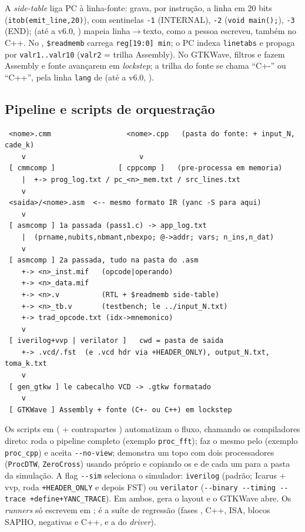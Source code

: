 A \emph{side-table} liga PC à linha-fonte:  grava, por
instrução, a linha em 20 bits (\lstinline|itob(emit_line,20)|), com sentinelas
\lstinline|-1| (INTERNAL), \lstinline|-2| (\lstinline|void main();|),
\lstinline|-3| (END);  (até a v6.0, )
mapeia linha$\to$texto, como a pessoa escreveu, também no C++. No
, \lstinline|$readmemb| carrega \lstinline|reg[19:0] min|; o PC
indexa \lstinline|linetabs| e propaga por \lstinline|valr1..valr10|
(\lstinline|valr2| = trilha Assembly). No GTKWave, filtros 
e  fazem Assembly e fonte avançarem em \emph{lockstep}; a
trilha do fonte se chama \enquote{C+-} ou \enquote{C++}, pela linha
\lstinline|lang| de  (até a v6.0, ).

\subsection{Pipeline e scripts de orquestração}
\label{sec:S04-pipeline}

\begin{lstlisting}
 <nome>.cmm                  <nome>.cpp   (pasta do fonte: + input_N, cade_k)
    v                           v
 [ cmmcomp ]               [ cppcomp ]   (pre-processa em memoria)
    |  +-> prog_log.txt / pc_<n>_mem.txt / src_lines.txt
    v
 <saida>/<nome>.asm  <-- mesmo formato IR (yanc -S para aqui)
    v
 [ asmcomp ] 1a passada (pass1.c) -> app_log.txt
    |  (prname,nubits,nbmant,nbexpo; @->addr; vars; n_ins,n_dat)
    v
 [ asmcomp ] 2a passada, tudo na pasta do .asm
    +-> <n>_inst.mif   (opcode|operando)
    +-> <n>_data.mif
    +-> <n>.v          (RTL + $readmemb side-table)
    +-> <n>_tb.v       (testbench; le ../input_N.txt)
    +-> trad_opcode.txt (idx->mnemonico)
    v
 [ iverilog+vvp | verilator ]   cwd = pasta de saida
    +-> .vcd/.fst  (e .vcd hdr via +HEADER_ONLY), output_N.txt, toma_k.txt
    v
 [ gen_gtkw ] le cabecalho VCD -> .gtkw formatado
    v
 [ GTKWave ] Assembly + fonte (C+- ou C++) em lockstep
\end{lstlisting}

Os scripts em  ( + contrapartes )
automatizam o fluxo, chamando os compiladores direto:  roda
o pipeline \cmm{} completo (exemplo \lstinline|proc_fft|);
 faz o mesmo pelo  (exemplo
\lstinline|proc_cpp|) e aceita \lstinline|--no-view|; 
demonstra um topo com dois processadores (\lstinline|ProcDTW|,
\lstinline|ZeroCross|) usando  próprio e copiando os
 e  de cada um para a pasta da simulação. A flag
\lstinline|--sim| seleciona o simulador: \lstinline|iverilog| (padrão; Icarus +
vvp, roda \lstinline|+HEADER_ONLY| e depois FST) ou \lstinline|verilator|
(\lstinline|--binary --timing --trace +define+YANC_TRACE|). Em ambos,
 gera o layout e o GTKWave abre. Os \emph{runners} só escrevem em
;  é a suíte de regressão (fases \cmm{}, C++, ISA,
blocos SAPHO, negativas \cmm{} e C++, e a do \emph{driver}).
